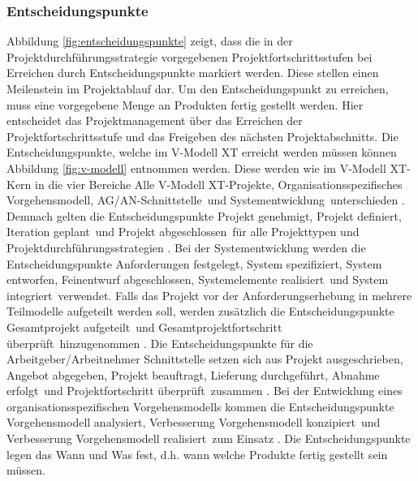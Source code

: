  \subsubsection{Entscheidungspunkte}
Abbildung \ref{fig:entscheidungspunkte} zeigt, dass die in der Projektdurchführungsstrategie vorgegebenen Projektfortschrittsstufen bei Erreichen durch Entscheidungspunkte markiert werden. Diese stellen einen Meilenstein im Projektablauf dar. Um den Entscheidungspunkt zu erreichen, muss eine vorgegebene Menge an Produkten fertig gestellt werden. Hier entscheidet das Projektmanagement über das Erreichen der Projektfortschrittsstufe und das Freigeben des nächsten Projektabschnitts. Die Entscheidungspunkte, welche im V-Modell XT erreicht werden müssen können Abbildung \ref{fig:v-modell} entnommen werden. Diese werden wie im V-Modell XT-Kern in die vier Bereiche \grqq Alle V-Modell XT-Projekte\grqq, \grqq Organisationsspezifisches Vorgehensmodell\grqq, \grqq AG/AN-Schnittstelle\grqq \ und \grqq Systementwicklung\grqq \ unterschieden \cite{2004vmodell}. \newline
Demnach gelten die Entscheidungspunkte \grqq Projekt genehmigt\grqq, \grqq Projekt definiert, \grqq Iteration geplant\grqq \ und \grqq Projekt abgeschlossen\grqq \ für alle Projekttypen und Projektdurchführungsstrategien \cite{2004vmodell}. \newline
Bei der Systementwicklung werden die Entscheidungspunkte \grqq Anforderungen festgelegt\grqq, \grqq System spezifiziert\grqq, \grqq System entworfen\grqq, \grqq Feinentwurf abgeschlossen\grqq, \grqq Systemelemente realisiert\grqq \ und \grqq System integriert\grqq \ verwendet. Falls das Projekt vor der Anforderungserhebung in mehrere Teilmodelle aufgeteilt werden soll, werden zusätzlich die Entscheidungspunkte \grqq Gesamtprojekt aufgeteilt\grqq \ und \grqq Gesamtprojektfortschritt überprüft\grqq \ hinzugenommen \cite{2004vmodell}. \newline
Die Entscheidungspunkte für die Arbeitgeber/Arbeitnehmer Schnittstelle setzen sich aus \grqq Projekt ausgeschrieben\grqq, \grqq Angebot abgegeben\grqq, \grqq Projekt beauftragt\grqq, \grqq Lieferung durchgeführt\grqq, \grqq Abnahme erfolgt\grqq \ und \grqq Projektfortschritt überprüft\grqq \ zusammen \cite{2004vmodell}. \newline
 Bei der Entwicklung eines organisationsspezifischen Vorgehensmodells kommen die Entscheidungspunkte \grqq Vorgehensmodell analysiert\grqq, \grqq Verbesserung Vorgehensmodell konzipiert\grqq \ und \grqq Verbesserung Vorgehensmodell realisiert\grqq \ zum Einsatz \cite{2004vmodell}. \newline
 Die Entscheidungspunkte legen das \grqq Wann\grqq {} und \grqq Was\grqq {} fest, d.h. wann welche Produkte fertig gestellt sein müssen.

